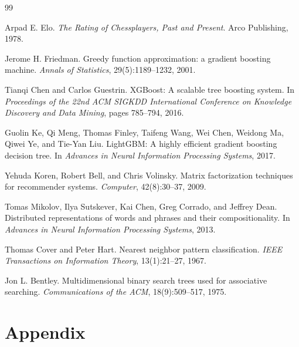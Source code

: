\documentclass[10pt,twocolumn]{article}
\begin{document}

\begin{thebibliography}{99}

    Arpad E. Elo.
    \newblock \emph{The Rating of Chessplayers, Past and Present}.
    \newblock Arco Publishing, 1978.

    Jerome H. Friedman.
    \newblock Greedy function approximation: a gradient boosting machine.
    \newblock \emph{Annals of Statistics}, 29(5):1189--1232, 2001.

    Tianqi Chen and Carlos Guestrin.
    \newblock XGBoost: A scalable tree boosting system.
    \newblock In \emph{Proceedings of the 22nd ACM SIGKDD International Conference on Knowledge Discovery and Data Mining}, pages 785--794, 2016.

    Guolin Ke, Qi Meng, Thomas Finley, Taifeng Wang, Wei Chen, Weidong Ma, Qiwei Ye, and Tie-Yan Liu.
    \newblock LightGBM: A highly efficient gradient boosting decision tree.
    \newblock In \emph{Advances in Neural Information Processing Systems}, 2017.

    Yehuda Koren, Robert Bell, and Chris Volinsky.
    \newblock Matrix factorization techniques for recommender systems.
    \newblock \emph{Computer}, 42(8):30--37, 2009.

    Tomas Mikolov, Ilya Sutskever, Kai Chen, Greg Corrado, and Jeffrey Dean.
    \newblock Distributed representations of words and phrases and their compositionality.
    \newblock In \emph{Advances in Neural Information Processing Systems}, 2013.

    Thomas Cover and Peter Hart.
    \newblock Nearest neighbor pattern classification.
    \newblock \emph{IEEE Transactions on Information Theory}, 13(1):21--27, 1967.

    Jon L. Bentley.
    \newblock Multidimensional binary search trees used for associative searching.
    \newblock \emph{Communications of the ACM}, 18(9):509--517, 1975.

\end{thebibliography}

\clearpage
\appendix

\section{Appendix}
\end{document}
